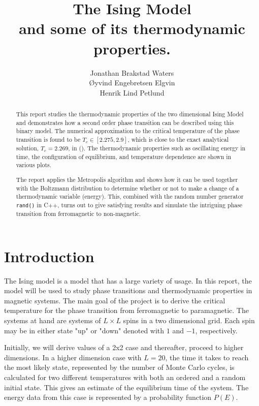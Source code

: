 \documentclass[12pt,english,a4paper]{article}
\title{The Ising Model \\ and some of its thermodynamic properties.}
\author{Jonathan Brakstad Waters\\Øyvind Engebretsen Elgvin\\Henrik Lind Petlund}
\begin{document}
\begin{titlepage}
\vfill
\maketitle
\begin{abstract}

This report studies the thermodynamic properties of the two dimensional Ising Model and demonstrates how a second order phase transition can be described using this binary model. The numerical approximation to the critical temperature of the phase transition is found to be $T_c \in [2.275,2.9]$, which is close to the exact analytical solution, $T_c = 2.269$, in (\cite{LarsOns}). The thermodynamic properties such as oscillating energy in time, the configuration of equilibrium, and temperature dependence are shown in various plots.

The report applies the Metropolis algorithm and shows how it can be used together with the Boltzmann distribution to determine whether or not to make a change of a thermodynamic variable (energy). This, combined with the random number generator \texttt{rand()} in C++, turns out to give satisfying results and simulate the intriguing phase transition from ferromagnetic to non-magnetic.

\newpage

\end{abstract}
\tableofcontents
\end{titlepage}

\section{Introduction} \label{introduction}

The Ising model is a model that has a large variety of usage. In this report, the model will be used to study phase transitions and thermodynamic properties in magnetic systems. The main goal of the project is to derive the critical temperature for the phase transition from ferromagnetic to paramagnetic. The systems at hand are systems of $L\times L$ spins in a two dimensional grid. Each spin may be in either state "up" or "down" denoted with $1$ and $-1$, respectively. 

Initially, we will derive values of a 2x2 case and thereafter, proceed to higher dimensions. In a higher dimension case with $L=20$, the time it takes to reach the most likely state, represented by the number of Monte Carlo cycles, is calculated for two different temperatures with both an ordered and a random initial state. This gives an estimate of the equilibrium time of the system. The energy data from this case is represented by a probability function $P(E)$. 
\end{document}
